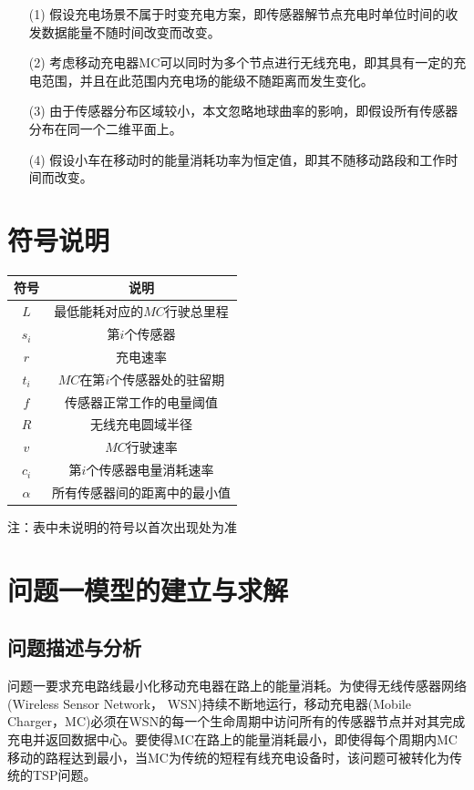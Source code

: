 \documentclass{whutmod}
\begin{document}
		\begin{itemize}  
		\item [(1)] 假设充电场景不属于时变充电方案，即传感器解节点充电时单位时间的收发数据能量不随时间改变而改变。
		\item [(2)] 考虑移动充电器MC可以同时为多个节点进行无线充电，即其具有一定的充电范围，并且在此范围内充电场的能级不随距离而发生变化。                 
		\item [(3)] 由于传感器分布区域较小，本文忽略地球曲率的影响，即假设所有传感器分布在同一个二维平面上。
		\item [(4)] 假设小车在移动时的能量消耗功率为恒定值，即其不随移动路段和工作时间而改变。

		\end{itemize}

		
\section{符号说明}
\begin{table}[H]
	\centering
	\setlength{\tabcolsep}{12mm}
	\begin{tabular}{cc}
		\toprule[1.5pt]
		\multicolumn{1}{m{5cm}}{\centering 符号} & \multicolumn{1}{m{5cm}}{\centering 说明} \\
		\midrule[1pt]		
		$L$  & 最低能耗对应的$MC$行驶总里程  \\ 
		$s_i$  & 第$i$个传感器  \\ 
		$r$  & 充电速率  \\ 
		$t_i$  & $MC$在第$i$个传感器处的驻留期  \\ 
		$f$  & 传感器正常工作的电量阈值  \\ 
		$R$  & 无线充电圆域半径  \\ 
		$v$  & $MC$行驶速率  \\ 
		$c_i$  & 第$i$个传感器电量消耗速率  \\ 
		$\alpha$  & 所有传感器间的距离中的最小值  \\ 
		\bottomrule[1.5pt]
	\end{tabular}
	\begin{tablenotes}
		\item 注：表中未说明的符号以首次出现处为准
	\end{tablenotes}
\end{table}

	\section{问题一模型的建立与求解}
		\subsection{问题描述与分析}		
			问题一要求充电路线最小化移动充电器在路上的能量消耗。为使得无线传感器网络
		(Wireless Sensor Network，	WSN)持续不断地运行，移动充电器(Mobile Charger，MC)必须在WSN的每一个生命周期中访问所有的传感器节点并对其完成充电并返回数据中心。要使得MC在路上的能量消耗最小，即使得每个周期内MC移动的路程达到最小，当MC为传统的短程有线充电设备时，该问题可被转化为传统的TSP问题。
		    
\end{document}
